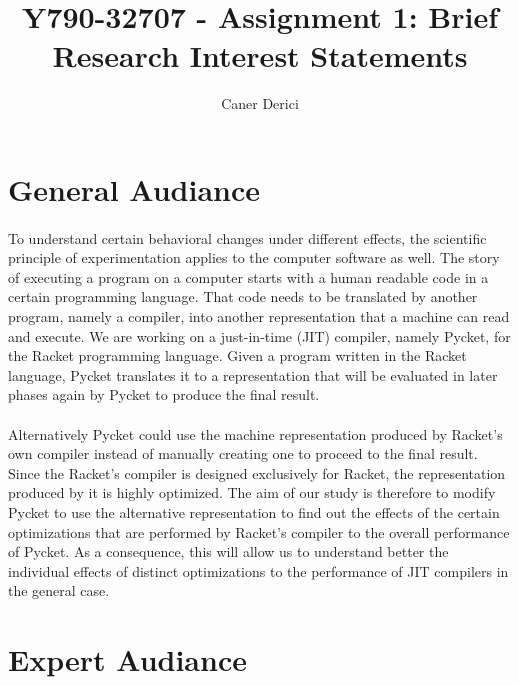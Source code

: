 \documentclass{article}
\title{Y790-32707 - Assignment 1: Brief Research Interest Statements}
\author{}
\date{Caner Derici}
\begin{document}

\maketitle%

\section{General Audiance}

\paragraph{}

To understand certain behavioral changes under different effects, the
scientific principle of experimentation applies to the computer
software as well. The story of executing a program on a computer
starts with a human readable code in a certain programming
language. That code needs to be translated by another program, namely
a compiler, into another representation that a machine can read and
execute. We are working on a just-in-time (JIT) compiler, namely
Pycket, for the Racket programming language. Given a program written
in the Racket language, Pycket translates it to a representation that
will be evaluated in later phases again by Pycket to produce the final
result.

\paragraph{} Alternatively Pycket could use the machine representation
produced by Racket's own compiler instead of manually creating one to
proceed to the final result. Since the Racket's compiler is designed
exclusively for Racket, the representation produced by it is highly
optimized. The aim of our study is therefore to modify Pycket to use
the alternative representation to find out the effects of the certain
optimizations that are performed by Racket's compiler to the overall
performance of Pycket. As a consequence, this will allow us to
understand better the individual effects of distinct optimizations to
the performance of JIT compilers in the general case.


\section{Expert Audiance}
\end{document}
